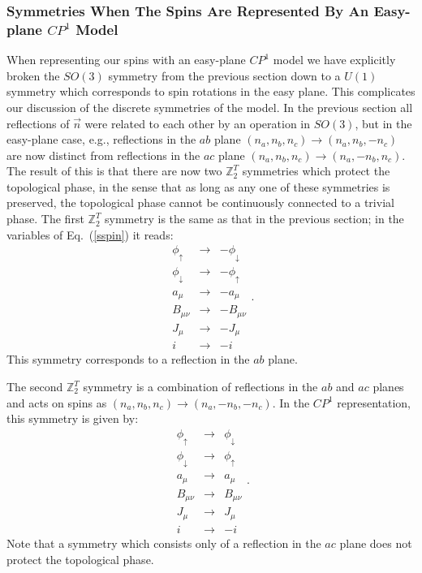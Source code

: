 \documentclass[prb,twocolumn]{revtex4-1}
\def\ztwot{\mathbb{Z}_2^T}
\newcommand{\cp}{$CP^1$ }
\begin{document}
\subsubsection{Symmetries When The Spins Are Represented By An Easy-plane \cp Model}
When representing our spins with an easy-plane \cp model we have explicitly broken the $SO(3)$ symmetry from the previous section down to a $U(1)$ symmetry which corresponds to spin rotations in the easy plane. 
This complicates our discussion of the discrete symmetries of the model. In the previous section all reflections of $\vec{n}$ were related to each other by an operation in $SO(3)$, but in the easy-plane case, e.g., reflections in the $ab$ plane $(n_a, n_b, n_c) \to (n_a, n_b, -n_c)$ are now distinct from reflections in the $ac$ plane $(n_a, n_b, n_c) \to (n_a, -n_b, n_c)$. The result of this is that there are now two $\ztwot$ symmetries which protect the topological phase, in the sense that as long as any one of these symmetries is preserved, the topological phase cannot be continuously connected to a trivial phase. 
The first $\ztwot$ symmetry is the same as that in the previous section; in the variables of Eq.~(\ref{sspin}) it reads:
\begin{equation}
\begin{array}{ccc}
 \phi_\uparrow&\rightarrow& -\phi_\downarrow \\
\phi_\downarrow&\rightarrow &-\phi_\uparrow \\
a_\mu&\rightarrow & -a_\mu \\
B_{\mu\nu}&\rightarrow & -B_{\mu\nu}\\
J_\mu &\rightarrow &-J_\mu \\
i & \rightarrow & -i
\end{array}.
\label{z2}
\end{equation}
This symmetry corresponds to a reflection in the $ab$ plane.

The second $\ztwot$ symmetry is a combination of reflections in the $ab$ and $ac$ planes and acts on spins as $(n_a, n_b, n_c) \to (n_a, -n_b, -n_c)$. In the \cp representation, this symmetry is given by:
\begin{equation}
\begin{array}{ccc}
 \phi_\uparrow&\rightarrow& \phi_\downarrow \\
\phi_\downarrow&\rightarrow &\phi_\uparrow \\
a_\mu&\rightarrow & a_\mu \\
B_{\mu\nu}&\rightarrow & B_{\mu\nu}\\
J_\mu &\rightarrow &J_\mu \\
i & \rightarrow & -i
\end{array}.
\label{z22}
\end{equation}
Note that a symmetry which consists only of a reflection in the $ac$ plane does not protect the topological phase. 
\end{document}
